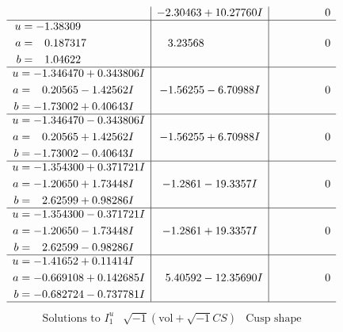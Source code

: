 \documentclass[1p]{elsarticle_modified}
\theoremstyle{definition}
\newcommand{\I}{\sqrt{-1}}
\begin{document}
$$\begin{array}{c|c|c}
 & -2.30463 + 10.27760 I & \phantom{-0.000000 } 0 \\ \hline\begin{aligned}
u &= -1.38309\phantom{ +0.000000I} \\
a &= \phantom{-}0.187317\phantom{ +0.000000I} \\
b &= \phantom{-}1.04622\phantom{ +0.000000I}\end{aligned}
 & \phantom{-}3.23568\phantom{ +0.000000I} & \phantom{-0.000000 } 0 \\ \hline\begin{aligned}
u &= -1.346470 + 0.343806 I \\
a &= \phantom{-}0.20565 - 1.42562 I \\
b &= -1.73002 + 0.40643 I\end{aligned}
 & -1.56255 - 6.70988 I & \phantom{-0.000000 } 0 \\ \hline\begin{aligned}
u &= -1.346470 - 0.343806 I \\
a &= \phantom{-}0.20565 + 1.42562 I \\
b &= -1.73002 - 0.40643 I\end{aligned}
 & -1.56255 + 6.70988 I & \phantom{-0.000000 } 0 \\ \hline\begin{aligned}
u &= -1.354300 + 0.371721 I \\
a &= -1.20650 + 1.73448 I \\
b &= \phantom{-}2.62599 + 0.98286 I\end{aligned}
 & -1.2861 - 19.3357 I & \phantom{-0.000000 } 0 \\ \hline\begin{aligned}
u &= -1.354300 - 0.371721 I \\
a &= -1.20650 - 1.73448 I \\
b &= \phantom{-}2.62599 - 0.98286 I\end{aligned}
 & -1.2861 + 19.3357 I & \phantom{-0.000000 } 0 \\ \hline\begin{aligned}
u &= -1.41652 + 0.11414 I \\
a &= -0.669108 + 0.142685 I \\
b &= -0.682724 - 0.737781 I\end{aligned}
 & \phantom{-}5.40592 - 12.35690 I & \phantom{-0.000000 } 0\\
 \hline 
 \end{array}$$\newpage$$\begin{array}{c|c|c}  
\text{Solutions to }I^u_{1}& \I (\text{vol} + \sqrt{-1}CS) & \text{Cusp shape}\\

\end{array}$$
\end{document}
